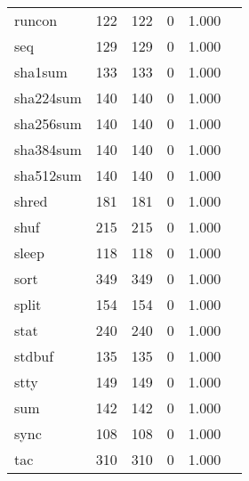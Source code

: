 \begin{longtable}{lp{2.40cm}p{2.40cm}p{2.40cm}p{2.40cm}p{2.40cm}}
runcon    &                     122 &              122 &                 0 &                        1.000 \\
seq       &                     129 &              129 &                 0 &                        1.000 \\
sha1sum   &                     133 &              133 &                 0 &                        1.000 \\
sha224sum &                     140 &              140 &                 0 &                        1.000 \\
sha256sum &                     140 &              140 &                 0 &                        1.000 \\
sha384sum &                     140 &              140 &                 0 &                        1.000 \\
sha512sum &                     140 &              140 &                 0 &                        1.000 \\
shred     &                     181 &              181 &                 0 &                        1.000 \\
shuf      &                     215 &              215 &                 0 &                        1.000 \\
sleep     &                     118 &              118 &                 0 &                        1.000 \\
sort      &                     349 &              349 &                 0 &                        1.000 \\
split     &                     154 &              154 &                 0 &                        1.000 \\
stat      &                     240 &              240 &                 0 &                        1.000 \\
stdbuf    &                     135 &              135 &                 0 &                        1.000 \\
stty      &                     149 &              149 &                 0 &                        1.000 \\
sum       &                     142 &              142 &                 0 &                        1.000 \\
sync      &                     108 &              108 &                 0 &                        1.000 \\
tac       &                     310 &              310 &                 0 &                        1.000 \\

\end{longtable}

